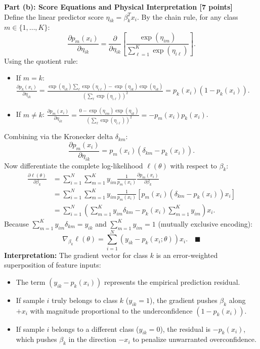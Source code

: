 \documentclass[11pt,a4paper]{article}
\begin{document}
\vspace{4pt}
\textbf{Part (b): Score Equations and Physical Interpretation [7 points]} \\
Define the linear predictor score $\eta_{ik} = \beta_k^T x_i$. By the chain rule, for any class $m \in \{1, \dots, K\}$:
\[
  \frac{\partial p_m(x_i)}{\partial \eta_{ik}} = \frac{\partial}{\partial \eta_{ik}} \left[ \frac{\exp(\eta_{im})}{\sum_{\ell=1}^K \exp(\eta_{i\ell})} \right].
\]
Using the quotient rule:
\begin{itemize}[itemsep=2pt, leftmargin=18pt]
  \item If $m = k$: $\frac{\partial p_k(x_i)}{\partial \eta_{ik}} = \frac{\exp(\eta_{ik})\sum_\ell \exp(\eta_{i\ell}) - \exp(\eta_{ik})\exp(\eta_{ik})}{\left( \sum_\ell \exp(\eta_{i\ell}) \right)^2} = p_k(x_i)(1 - p_k(x_i))$.
  \item If $m \ne k$: $\frac{\partial p_m(x_i)}{\partial \eta_{ik}} = \frac{0 - \exp(\eta_{im})\exp(\eta_{ik})}{\left( \sum_\ell \exp(\eta_{i\ell}) \right)^2} = -p_m(x_i) p_k(x_i)$.
\end{itemize}
Combining via the Kronecker delta $\delta_{km}$:
\[
  \frac{\partial p_m(x_i)}{\partial \eta_{ik}} = p_m(x_i) \left( \delta_{km} - p_k(x_i) \right).
\]
Now differentiate the complete log-likelihood $\ell(\theta)$ with respect to $\beta_k$:
\begin{align*}
  \frac{\partial \ell(\theta)}{\partial \beta_k} &= \sum_{i=1}^N \sum_{m=1}^K y_{im} \frac{1}{p_m(x_i)} \frac{\partial p_m(x_i)}{\partial \beta_k} \\
  &= \sum_{i=1}^N \sum_{m=1}^K y_{im} \frac{1}{p_m(x_i)} \left[ p_m(x_i)(\delta_{km} - p_k(x_i)) x_i \right] \\
  &= \sum_{i=1}^N \left( \sum_{m=1}^K y_{im} \delta_{km} - p_k(x_i) \sum_{m=1}^K y_{im} \right) x_i.
\end{align*}
Because $\sum_{m=1}^K y_{im} \delta_{km} = y_{ik}$ and $\sum_{m=1}^K y_{im} = 1$ (mutually exclusive encoding):
\[
  \nabla_{\beta_k} \ell(\theta) = \sum_{i=1}^N \left( y_{ik} - p_k(x_i; \theta) \right) x_i. \quad \blacksquare
\]
\textbf{Interpretation:} The gradient vector for class $k$ is an error-weighted superposition of feature inputs:
\begin{itemize}[itemsep=2pt, leftmargin=18pt]
  \item The term $(y_{ik} - p_k(x_i))$ represents the empirical prediction residual.
  \item If sample $i$ truly belongs to class $k$ ($y_{ik} = 1$), the gradient pushes $\beta_k$ along $+x_i$ with magnitude proportional to the underconfidence $(1 - p_k(x_i))$.
  \item If sample $i$ belongs to a different class ($y_{ik} = 0$), the residual is $-p_k(x_i)$, which pushes $\beta_k$ in the direction $-x_i$ to penalize unwarranted overconfidence.
\end{itemize}
\end{document}
